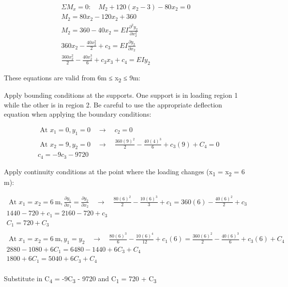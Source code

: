 \documentclass[
  letterpaper,
  DIV=11,
  numbers=noendperiod]{scrreprt}
\begin{document}
\begin{tcolorbox}
\begin{tcolorbox}
\[
\begin{gathered}  \Sigma M_x=0: \quad M_2+120\left(x_2-3\right)-80 x_2=0 \\  M_2  =80 x_2-120 x_2+360 \\  M_2 =360-40 x_2=E I \frac{\partial^2 y_2}{\partial x_2^2} \\  360 x_2-\frac{40 x_2^2}{2}+c_3=E I \frac{\partial y_2}{\partial x_2} \\  \frac{360 x_2^2}{2}-\frac{40 x_2^3}{6}+c_3 x_3+c_4  =E I y_2\end{gathered}
\]

These equations are valid from 6m ≤ x\textsubscript{2} ≤ 9m:

Apply bounding conditions at the supports. One support is in loading
region 1 while the other is in region 2. Be careful to use the
appropriate deflection equation when applying the boundary conditions:

\[
\begin{aligned} & \text { At } x_1=0, y_1=0 \quad \rightarrow \quad c_2=0 \\ & \text { At } x_2=9, y_2=0 \quad \rightarrow \quad \frac{360(9)^2}{2}-\frac{40(4)^3}{6}+c_3(9) +C_4=0 \\ & c_4=-9 c_3-9720\end{aligned}
\]

Apply continuity conditions at the point where the loading changes
(x\textsubscript{1} = x\textsubscript{2} = 6 m):

\[
\begin{gathered} \text { At } x_1=x_2=6 \mathrm{~m}, \frac{\partial y_1}{\partial x_1}=\frac{\partial y_2}{\partial x_2} \quad \rightarrow \quad \frac{80(6)^2}{2}-\frac{10(6)^3}{3}+c_1=360(6)-\frac{40(6)^2}{2}+c_3 \\ 1440-720+c_1=2160-720+c_3 \\ C_1=720+C_3 \\ \\  \text { At } x_1=x_2=6 \mathrm{~m}, y_1=y_2 \quad \rightarrow \quad\frac{80(6)^3}{6}-\frac{10(6)^4}{12}+c_1(6)=\frac{360(6)^2}{2} - \frac{40(6)^3}{6}+c_3(6) +C_4 \\ 2880-1080+6 C_1=6480-1440+6 C_3+C_4 \\ 1800+6 C_1=5040+6 C_3+C_4 \\\end{gathered}
\]

Substitute in C\textsubscript{4} = -9C\textsubscript{3} - 9720 and
C\textsubscript{1} = 720 + C\textsubscript{3}


\end{tcolorbox}
\end{tcolorbox}
\end{document}
